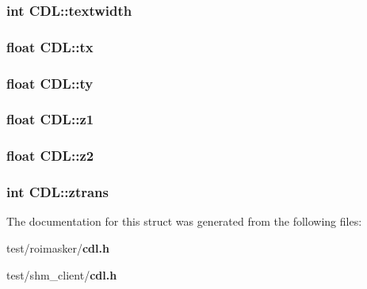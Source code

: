 \subsubsection{\setlength{\rightskip}{0pt plus 5cm}int \bf{CDL::textwidth}}\label{structCDL_50263d514c16b0a86ad6b055383085cd}


\subsubsection{\setlength{\rightskip}{0pt plus 5cm}float \bf{CDL::tx}}\label{structCDL_55ee29e52ed1a0b5ca3fa264633e9633}


\subsubsection{\setlength{\rightskip}{0pt plus 5cm}float \bf{CDL::ty}}\label{structCDL_4c94908a8b4a4c1aababfc6d983b9487}


\subsubsection{\setlength{\rightskip}{0pt plus 5cm}float \bf{CDL::z1}}\label{structCDL_ac8944f7643e91c9abfac06e4188a74f}


\subsubsection{\setlength{\rightskip}{0pt plus 5cm}float \bf{CDL::z2}}\label{structCDL_4cb7022aa2feeffabb46e67cf3f07002}


\subsubsection{\setlength{\rightskip}{0pt plus 5cm}int \bf{CDL::ztrans}}\label{structCDL_a5cf34094859daf4cd42a5fd997f3f1b}




The documentation for this struct was generated from the following files:\begin{CompactItemize}
\item 
test/roimasker/\bf{cdl.h}\item 
test/shm\_\-client/\bf{cdl.h}\end{CompactItemize}
